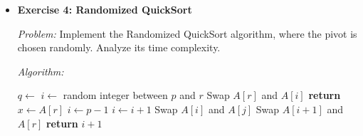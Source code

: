 \documentclass[12pt]{book} %
\begin{document}
\begin{itemize}
    \textit{Solution:}
    
    \begin{lstlisting}
import random
import matplotlib.pyplot as plt

def monte_carlo_pi(n):
    inside_circle = 0
    x_inside = []
    y_inside = []
    x_outside = []
    y_outside = []
    for _ in range(n):
        x, y = random.uniform(0, 1), random.uniform(0, 1)
        if x**2 + y**2 <= 1:
            inside_circle += 1
            x_inside.append(x)
            y_inside.append(y)
        else:
            x_outside.append(x)
            y_outside.append(y)
    pi_estimate = (inside_circle / n) * 4
    return pi_estimate, x_inside, y_inside, x_outside, y_outside

# Estimate pi using 10000 random points
pi_estimate, x_inside, y_inside, x_outside, y_outside = monte_carlo_pi(10000)

# Plot the points
plt.scatter(x_inside, y_inside, color='blue', s=1)
plt.scatter(x_outside, y_outside, color='red', s=1)
plt.title(f'Monte Carlo Estimation of Pi: {pi_estimate}')
plt.xlabel('X')
plt.ylabel('Y')
plt.axis('equal')
plt.show()
    \end{lstlisting}
    \FloatBarrier

    \item \textbf{Exercise 4: Randomized QuickSort}
    
    \textit{Problem:} Implement the Randomized QuickSort algorithm, where the pivot is chosen randomly. Analyze its time complexity.

    \textit{Algorithm:}
    
    \begin{algorithm}
    \caption{Randomized QuickSort}
    \begin{algorithmic}[1]
            \State $q \gets$ 
            \State {}
            \State {}
        \EndIf
    \EndProcedure
        \State $i \gets$ random integer between $p$ and $r$
        \State Swap $A[r]$ and $A[i]$
        \State \textbf{return} 
    \EndProcedure
        \State $x \gets A[r]$
        \State $i \gets p - 1$
                \State $i \gets i + 1$
                \State Swap $A[i]$ and $A[j]$
            \EndIf
        \EndFor
        \State Swap $A[i+1]$ and $A[r]$
        \State \textbf{return} $i + 1$
    \EndProcedure
    \end{algorithmic}
    \end{algorithm}


\end{itemize}
\end{document}
